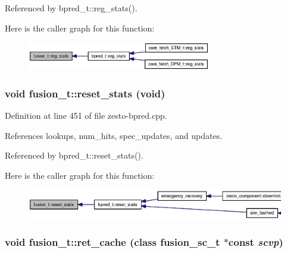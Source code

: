 Referenced by bpred\_\-t::reg\_\-stats().

Here is the caller graph for this function:\nopagebreak
\begin{figure}[H]
\begin{center}
\leavevmode
\includegraphics[width=227pt]{classfusion__t_45c940f6458a028bd8a86684e5edce4a_icgraph}
\end{center}
\end{figure}
\subsubsection[{reset\_\-stats}]{\setlength{\rightskip}{0pt plus 5cm}void fusion\_\-t::reset\_\-stats (void)\hspace{0.3cm}{\tt  [virtual]}}\label{classfusion__t_4165e6ee084855edb02c6ec02110c614}




Definition at line 451 of file zesto-bpred.cpp.

References lookups, num\_\-hits, spec\_\-updates, and updates.

Referenced by bpred\_\-t::reset\_\-stats().

Here is the caller graph for this function:\nopagebreak
\begin{figure}[H]
\begin{center}
\leavevmode
\includegraphics[width=420pt]{classfusion__t_4165e6ee084855edb02c6ec02110c614_icgraph}
\end{center}
\end{figure}
\subsubsection[{ret\_\-cache}]{\setlength{\rightskip}{0pt plus 5cm}void fusion\_\-t::ret\_\-cache (class {\bf fusion\_\-sc\_\-t} $\ast$const  {\em scvp})\hspace{0.3cm}{\tt  [virtual]}}\label{classfusion__t_cd9d90c41c0eceaf5fdbc4aaac9f1edf}





